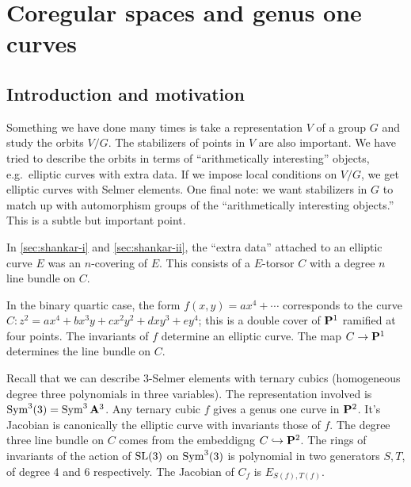 
\section{Coregular spaces and genus one curves}\label{sec:ho}





\subsection{Introduction and motivation}

Something we have done many times is take a representation $V$ of a group $G$ 
and study the orbits $V/G$. The stabilizers of points in $V$ are also 
important. We have tried to describe the orbits in terms of ``arithmetically 
interesting'' objects, e.g.~elliptic curves with extra data. If we impose 
local conditions on $V/G$, we get elliptic curves with Selmer elements. One 
final note: we want stabilizers in $G$ to match up with automorphism groups of 
the ``arithmetically interesting objects.'' This is a subtle but important 
point. 

In \autoref{sec:shankar-i} and \autoref{sec:shankar-ii}, the ``extra data'' 
attached to an elliptic curve $E$ was an $n$-covering of $E$. This consists 
of a $E$-torsor $C$ with a degree $n$ line bundle on $C$. 

\begin{example}
In the binary quartic case, the form $f(x,y) = a x^4 + \cdots$ corresponds to 
the curve $C:z^2 = a x^4 + b x^3 y + c x^2 y^2 + d x y^3 + e y^4$; this is a 
double cover of $\mathbf{P}^1$ ramified at four points. The invariants of $f$ 
determine an elliptic curve. The map $C\to \mathbf{P}^1$ determines the line bundle 
on $C$. 
\end{example}

\begin{example}
Recall that we can describe 3-Selmer elements with ternary cubics (homogeneous 
degree three polynomials in three variables). The representation involved 
is $\operatorname{Sym}^3(3) = \operatorname{Sym}^3\mathbf{A}^3$. Any ternary cubic $f$ gives a genus 
one curve in $\mathbf{P}^2$. It's Jacobian is canonically the elliptic curve with 
invariants those of $f$. The degree three line bundle on $C$ comes from the 
embeddigng $C\hookrightarrow \mathbf{P}^2$. The rings of invariants of the action of 
$\operatorname{SL}(3)$ on $\operatorname{Sym}^3(3)$ is polynomial in two generators 
$S,T$, of degree 4 and 6 respectively. The Jacobian of $C_f$ is 
$E_{S(f),T(f)}$. 
\end{example}

